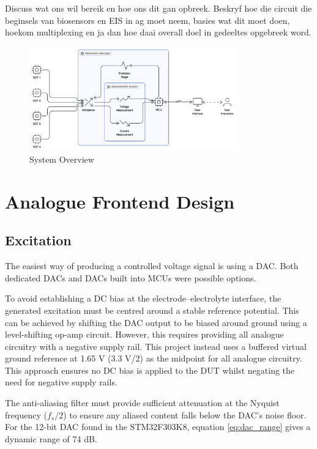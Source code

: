 Discuss wat ons wil bereik en hoe ons dit gan opbreek. Beskryf hoe die circuit die beginsels van biosensors en EIS in ag moet neem, basies wat dit moet doen, hoekom multiplexing en ja dan hoe daai overall doel in gedeeltes opgebreek word.

\begin{figure}[H]
    \centering
    \includegraphics[width=0.8\textwidth]{SystemOverview.png}
    \caption{System Overview}
    \label{fig:system_overview} 
\end{figure}

\section{Analogue Frontend Design}

\subsection{Excitation}\label{subsec:design_excitation}
The easiest way of producing a controlled voltage signal is using a \ac{DAC}. Both dedicated \acp{DAC} and \acp{DAC} built into \acp{MCU} were possible options.

To avoid establishing a DC bias at the electrode–electrolyte interface, the generated excitation must be centred around a stable reference potential. This can be achieved by shifting the \ac{DAC} output to be biased around ground using a level-shifting op-amp circuit. However, this requires providing all analogue circuitry with a negative supply rail. This project instead uses a buffered virtual ground reference at 1.65 V (3.3 V/2) as the midpoint for all analogue circuitry. This approach ensures no DC bias is applied to the \ac{DUT} whilst negating the need for negative supply rails.

The anti-aliasing filter must provide sufficient attenuation at the Nyquist frequency ($f_s/2$) to ensure any aliased content falls below the \ac{DAC}'s noise floor. For the 12-bit \ac{DAC} found in the STM32F303K8, equation \ref{eq:dac_range} gives a dynamic range of 74 dB. 

